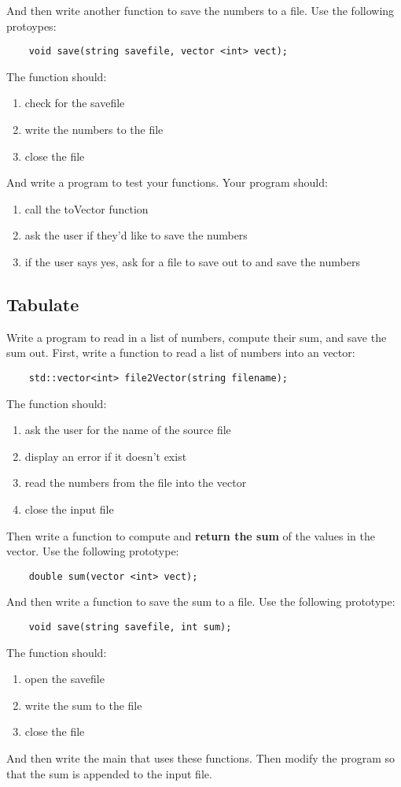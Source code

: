 \documentclass{article}
\begin{document}
 And then write another function to save the numbers to a file. Use the following protoypes:
\begin{verbatim}
	void save(string savefile, vector <int> vect);
\end{verbatim}
The function should:
\begin{enumerate}
	\item check for the savefile
	\item write the numbers to the file
	\item close the file
\end{enumerate}
And write a program to test your functions. Your program should:
\begin{enumerate}
	\item call the toVector function
	\item ask the user if they'd like to save the numbers
	\item if the user says yes, ask for a file to save out to and save the numbers
\end{enumerate}

\subsection{Tabulate}
Write a program to read in a list of numbers, compute their sum, and save the sum out. First, write a function to read a list of numbers into an vector:
\begin{verbatim}
	std::vector<int> file2Vector(string filename);
\end{verbatim}
The function should:
\begin{enumerate}
	\item ask the user for the name of the source file
	\item display an error if it doesn't exist
	\item read the numbers from the file into the vector
	\item close the input file
\end{enumerate}
Then write a function to compute and \textbf{return the sum} of the values in the vector. Use the following prototype:
\begin{lstlisting}
	double sum(vector <int> vect);
\end{lstlisting}
And then write a function to save the sum to a file. Use the following prototype:
\begin{verbatim}
	void save(string savefile, int sum);
\end{verbatim}
The function should:
\begin{enumerate}
	\item open the savefile
	\item write the sum to the file
	\item close the file
\end{enumerate}
And then write the main that uses these functions. Then modify the program so that the sum is appended to the input file.
\end{document}
